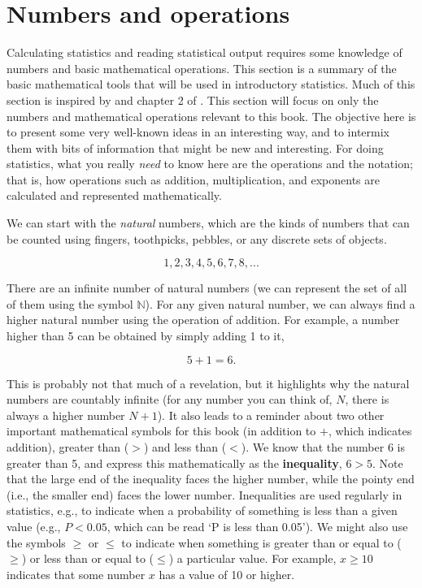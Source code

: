 \documentclass[
  openany]{krantz}
\begin{document}
\hypertarget{numbers-and-operations}{%
\section{Numbers and operations}\label{numbers-and-operations}}

Calculating statistics and reading statistical output requires some knowledge of numbers and basic mathematical operations.
This section is a summary of the basic mathematical tools that will be used in introductory statistics.
Much of this section is inspired by \citet{Courant1996} and chapter 2 of \citet{Pastor2008}.
This section will focus on only the numbers and mathematical operations relevant to this book.
The objective here is to present some very well-known ideas in an interesting way, and to intermix them with bits of information that might be new and interesting.
For doing statistics, what you really \emph{need} to know here are the operations and the notation; that is, how operations such as addition, multiplication, and exponents are calculated and represented mathematically.

We can start with the \emph{natural} numbers, which are the kinds of numbers that can be counted using fingers, toothpicks, pebbles, or any discrete sets of objects.

\[1, 2, 3, 4, 5, 6, 7, 8, ...\]

There are an infinite number of natural numbers (we can represent the set of all of them using the symbol \(\mathbb{N}\)).
For any given natural number, we can always find a higher natural number using the operation of addition.
For example, a number higher than 5 can be obtained by simply adding 1 to it,

\[5 + 1 = 6.\]

This is probably not that much of a revelation, but it highlights why the natural numbers are countably infinite (for any number you can think of, \(N\), there is always a higher number \(N + 1\)).
It also leads to a reminder about two other important mathematical symbols for this book (in addition to \(+\), which indicates addition), greater than (\(>\)) and less than (\(<\)).
We know that the number 6 is greater than 5, and express this mathematically as the \textbf{inequality}, \(6 > 5\).
Note that the large end of the inequality faces the higher number, while the pointy end (i.e., the smaller end) faces the lower number.
Inequalities are used regularly in statistics, e.g., to indicate when a probability of something is less than a given value (e.g., \(P < 0.05\), which can be read `P is less than 0.05').
We might also use the symbols \(\geq\) or \(\leq\) to indicate when something is greater than or equal to (\(\geq\)) or less than or equal to (\(\leq\)) a particular value.
For example, \(x \geq 10\) indicates that some number \(x\) has a value of 10 or higher.
\end{document}
